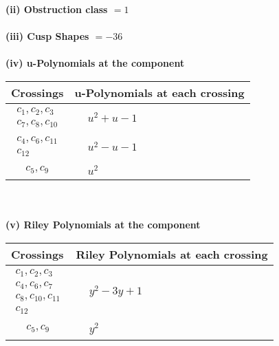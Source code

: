 \documentclass[1p]{elsarticle_modified}
\theoremstyle{definition}
\begin{document}
\flushleft \textbf{(ii) Obstruction class $= 1$}\\~\\
\flushleft \textbf{(iii) Cusp Shapes $= -36$}\\~\\
\newpage\renewcommand{\arraystretch}{1}
\flushleft \textbf{(iv) u-Polynomials at the component}\newline \\
\begin{tabular}{m{50pt}|m{274pt}}
Crossings & \hspace{64pt}u-Polynomials at each crossing \\
\hline $$\begin{aligned}c_{1},c_{2},c_{3}\\c_{7},c_{8},c_{10}\end{aligned}$$&$\begin{aligned}
&u^2+u-1
\end{aligned}$\\
\hline $$\begin{aligned}c_{4},c_{6},c_{11}\\c_{12}\end{aligned}$$&$\begin{aligned}
&u^2- u-1
\end{aligned}$\\
\hline $$\begin{aligned}c_{5},c_{9}\end{aligned}$$&$\begin{aligned}
&u^2
\end{aligned}$\\
\hline
\end{tabular}\\~\\
\newpage\renewcommand{\arraystretch}{1}
\flushleft \textbf{(v) Riley Polynomials at the component}\newline \\
\begin{tabular}{m{50pt}|m{274pt}}
Crossings & \hspace{64pt}Riley Polynomials at each crossing \\
\hline $$\begin{aligned}c_{1},c_{2},c_{3}\\c_{4},c_{6},c_{7}\\c_{8},c_{10},c_{11}\\c_{12}\end{aligned}$$&$\begin{aligned}
&y^2-3 y+1
\end{aligned}$\\
\hline $$\begin{aligned}c_{5},c_{9}\end{aligned}$$&$\begin{aligned}
&y^2
\end{aligned}$\\
\hline
\end{tabular}\\~\\
\end{document}
